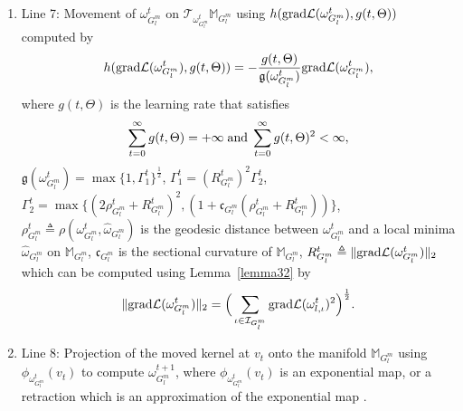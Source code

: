 \documentclass[10pt,journal,compsoc]{IEEEtran}
\newcommand{\gr}{{\rm grad}}
\theoremstyle{definition}
\theoremstyle{definition}
\theoremstyle{remark}
\theoremstyle{remark}
\theoremstyle{remark}
\begin{document}
\begin{enumerate}[leftmargin=*]
	 
	\item Line 7: Movement of $\omega^t_{G^m_l}$ on $\mathcal{T}_{\omega^t_{G^m_l}} \mathbb{M}_{G^m_l}$ using $ h(\gr \mathcal{L}(\omega_{G^m_l}^{t}), g(t,\Theta))$ computed by
	\begin{equation}
	h(\gr \mathcal{L}(\omega_{G^m_l}^{t}), g(t,\Theta)) = -\frac{g(t,\Theta)}{\mathfrak{g}(\omega_{G^m_l}^t)}\gr \mathcal{L}(\omega_{G^m_l}^{t}),
	\label{eq:steps}
	\end{equation}
	where $g(t,\Theta)$ is the learning rate that satisfies
\begin{equation}
\sum_{t=0} ^{\infty} g(t,\Theta) = +\infty \; {\rm and} \; \sum_{t=0} ^{\infty} g(t,\Theta)^2 < \infty,
\label{eq:rate}
\end{equation} 
 $\mathfrak{g}(\omega_{G^m_l}^t) = \max\{ 1,\Gamma_1^t\}^{\frac{1}{2}}$, $\Gamma_1^t = (R_{G^m_l}^{t})^2 \Gamma_2^t$, ${\Gamma_2^t = \max \{(2\rho_{G^m_l}^{t} + R_{G^m_l}^{t})^2, (1+\mathfrak{c}_{G^m_l}(\rho_{G^m_l}^{t} + R_{G^m_l}^{t}))\} }$, $\rho_{G^m_l}^{t} \triangleq \rho(\omega_{G^m_l}^t, \hat{\omega}_{G^m_l}) $ is the geodesic distance between $\omega_{G^m_l}^t$ and a local minima $\hat{\omega}_{G^m_l}$ on $\mathbb{M}_{G^m_l}$, $\mathfrak{c}_{G^m_l}$ is the sectional curvature of $\mathbb{M}_{G^m_l}$, $R_{G^m_l}^{t} \triangleq  \| \gr \mathcal{L}(\omega_{G^m_l}^{t})  \|_2$ which can be computed using Lemma~\ref{lemma32} by
\begin{equation}
 \| \gr \mathcal{L}(\omega_{G^m_l}^{t})  \|_2 = \Big (\sum \limits_{\iota \in \mathcal{I}_{G^m_l}} \gr \mathcal{L}(\omega_{l,\iota}^{t})^2 \Big)^{\frac{1}{2}}.
 \label{eq:grad_norm}
\end{equation} 

	
	\item Line 8: Projection of the moved kernel at $v_t$ onto the manifold $\mathbb{M}_{G^m_l}$ using $\phi_{\omega_{G^m_l}^t}(  v_t)$ to compute $\omega^{t+1}_{G^m_l}$, where $\phi_{\omega_{G^m_l}^t}(  v_t)$ is an exponential map, or a retraction which is an approximation of the exponential map \cite{absil_retr}.
\end{enumerate}   
\end{document}
